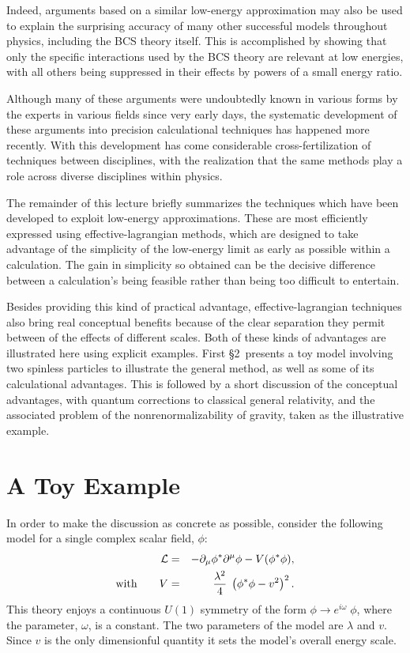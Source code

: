 \documentclass[12pt]{article}
\begin{document}
Indeed, arguments based on a similar
low-energy approximation may also be used to explain the
surprising accuracy of many other successful models throughout
physics, including the BCS theory itself.\cite{Polchinski,Shankar,Frohlich} 
This is accomplished by showing that only the specific 
interactions used by the BCS theory are relevant at low energies, 
with all others being suppressed in their effects by powers of a 
small energy ratio. 

Although many of these arguments were undoubtedly known in various
forms by the experts in various fields since very early days, 
the systematic development of these arguments into precision
calculational techniques has happened more recently. With this
development has come considerable cross-fertilization of 
techniques between disciplines, with the realization that the same 
methods play a role across diverse disciplines within physics. 

The remainder of this lecture briefly summarizes the
techniques which have been developed to exploit low-energy
approximations. These are most efficiently expressed
using effective-lagrangian methods, which are designed
to take advantage of the simplicity of the low-energy limit
as early as possible within a calculation. The gain in
simplicity so obtained can be the decisive difference
between a calculation's being feasible rather than 
being too difficult to entertain. 

Besides providing this kind of practical advantage, 
effective-lagrangian techniques also bring real conceptual 
benefits because of the clear separation they permit between
of the effects of different scales. Both of these kinds of
advantages are illustrated here using explicit examples. First
\S2\ presents a toy model involving two spinless particles to
illustrate the general method, as well as some of its 
calculational advantages. This is followed by a short 
discussion of the conceptual advantages, with 
quantum corrections to classical general relativity, 
and the associated problem of the nonrenormalizability 
of gravity, taken as the illustrative example. 

\section{A Toy Example}

In order to make the discussion as concrete as possible,
consider the following model for a single complex scalar field, $\phi$:
%
\begin{eqnarray}
\label{abeltoymodel}
{\cal L} &=& - \partial_\mu \phi^* \partial^\mu \phi - 
V(\phi^* \phi), \nonumber\\
\hbox{with} \qquad V &=& {\lambda^2 \over 4} \; 
\left( \phi^* \phi - v^2 \right)^2 .
\end{eqnarray}
%
This theory enjoys a continuous $U(1)$ symmetry of the form 
$\phi \to e^{i\omega} \; \phi$, where the parameter, $\omega$, 
is a constant. The two parameters of the model are 
$\lambda$ and $v$. Since $v$ is the only dimensionful 
quantity it sets the model's overall energy scale.
\end{document}

